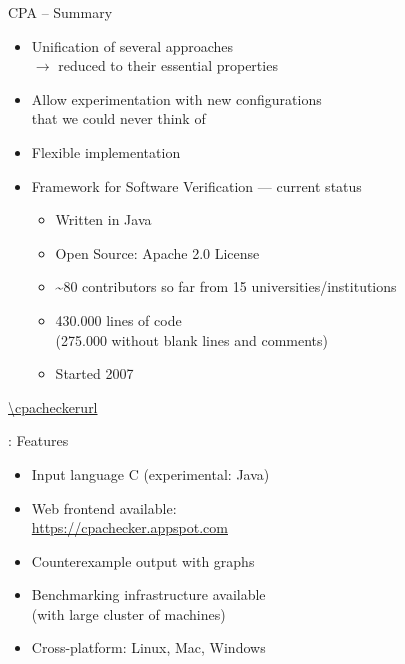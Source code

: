 
\begin{frame}{CPA -- Summary}
  \begin{itemize}
    \item Unification of several approaches\\
    $\rightarrow$ reduced to their essential properties
    \item Allow experimentation with new configurations\\ that we could never think of
    \item Flexible implementation \cpachecker
  \end{itemize}
\end{frame}


\begin{frame}{\cpacheckertitle}
  \begin{itemize}
    \item Framework for Software Verification --- current status
    \begin{itemize}
      \item Written in Java
      \item Open Source: Apache 2.0 License
      \item \textasciitilde80 contributors so far from 15 universities/institutions
      \item 430.000 lines of code\\
      (275.000 without blank lines and comments)
      \item Started 2007
    \end{itemize}
  \end{itemize}
  \bigskip
  \centering\url{\cpacheckerurl}
\end{frame}


\begin{frame}{\cpacheckertitle: Features}
  \begin{itemize}
    \item Input language C (experimental: Java)
    \item Web frontend available:\\
    \url{https://cpachecker.appspot.com}
    \item Counterexample output with graphs
    \item Benchmarking infrastructure available\\
    (with large cluster of machines)
    \item Cross-platform: Linux, Mac, Windows
  \end{itemize}
\end{frame}

